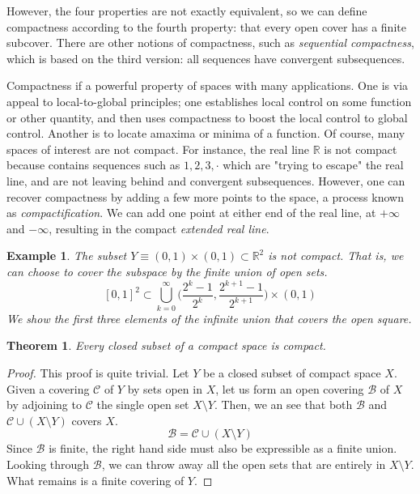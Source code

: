 \documentclass{article}
\newtheorem{theorem}{Theorem}[section]
\newtheorem{example}{Example}[section]
\theoremstyle{remark}
\theoremstyle{definition}
\begin{document}
However, the four properties are not exactly equivalent, so we can define compactness according to the fourth property: that every open cover has a finite subcover. There are other notions of compactness, such as \textit{sequential compactness}, which is based on the third version: all sequences have convergent subsequences. 

Compactness if a powerful property of spaces with many applications. One is via appeal to local-to-global principles; one establishes local control on some function or other quantity, and then uses compactness to boost the local control to global control. Another is to locate amaxima or minima of a function. Of course, many spaces of interest are not compact. For instance, the real line $\mathbb{R}$ is not compact because contains sequences such as $1, 2, 3, \cdot$ which are "trying to escape" the real line, and are not leaving behind and convergent subsequences. However, one can recover compactness by adding a few more points to the space, a process known as \textit{compactification}. We can add one point at either end of the real line, at $+\infty$ and $-\infty$, resulting in the compact \textit{extended real line}. 


\begin{example}
The subset $Y \equiv (0,1) \times (0,1) \subset \mathbb{R}^2$ is not compact. That is, we can choose to cover the subspace by the finite union of open sets. 
\[[0,1]^2 \subset \bigcup_{k=0}^\infty \Big( \frac{2^k - 1}{2^k}, \frac{2^{k+1} - 1}{2^{k+1}} \Big) \times (0,1)\]
We show the first three elements of the infinite union that covers the open square.  
\begin{center}
\end{center}
\end{example}

\begin{theorem}
Every closed subset of a compact space is compact. 
\end{theorem}
\begin{proof}
This proof is quite trivial. Let $Y$ be a closed subset of compact space $X$. Given a covering $\mathcal{C}$ of $Y$ by sets open in $X$, let us form an open covering $\mathscr{B}$ of $X$ by adjoining to $\mathcal{C}$ the single open set $X \setminus Y$. Then, we an see that both $\mathscr{B}$ and $\mathcal{C} \cup (X \setminus Y)$ covers $X$. 
\[\mathscr{B} = \mathcal{C} \cup (X \setminus Y)\]
Since $\mathscr{B}$ is finite, the right hand side must also be expressible as a finite union. Looking through $\mathscr{B}$, we can throw away all the open sets that are entirely in $X \setminus Y$. What remains is a finite covering of $Y$. 
\end{proof}
\end{document}
